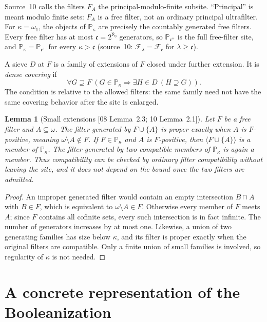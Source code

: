 \documentclass[11pt,letterpaper]{article}
\newtheorem{lemma}[theorem]{Lemma}
\theoremstyle{definition}
\theoremstyle{remark}
\newcommand{\om}{\omega}
\newcommand{\PP}{\mathbb P}
\newcommand{\cc}{\mathfrak c}
\newcommand{\gen}[1]{\langle #1\rangle}
\newcommand{\src}[1]{\textup{[#1]}}
\begin{document}
Source~10 calls the filters $F_A$ the principal-modulo-finite subsite.
``Principal'' is meant modulo finite sets: $F_A$ is a free filter, not
an ordinary principal ultrafilter. For $\kappa=\om_1$, the objects of
$\PP_\kappa$ are precisely the countably generated free filters. Every
free filter has at most $\cc=2^{\aleph_0}$ generators, so $\PP_{\cc^+}$
is the full free-filter site, and $\PP_\kappa=\PP_{\cc^+}$ for every
$\kappa>\cc$ (source~10: $\mathcal F_\lambda=\mathcal F_\cc$ for
$\lambda\geq\cc$).

A sieve $D$ at $F$ is a family of extensions of $F$ closed under further
extension. It is \emph{dense covering} if
\begin{equation}\label{fbc:eq:dense-cover}
 \forall G\supseteq F\ (G\in\PP_\kappa\Rightarrow
 \exists H\in D\ (H\supseteq G)).
\end{equation}
The condition is relative to the allowed filters: the same family need
not have the same covering behavior after the site is enlarged.

\begin{lemma}[Small extensions \src{08 Lemma~2.3; 10 Lemma~2.1}]
\label{fbc:lem:small-extensions}
Let $F$ be a free filter and $A\subseteq\om$. The filter generated by
$F\cup\{A\}$ is proper exactly when $A$ is $F$-positive, meaning
$\om\setminus A\notin F$. If $F\in\PP_\kappa$ and $A$ is $F$-positive,
then $\gen{F\cup\{A\}}$ is a member of $\PP_\kappa$. The filter
generated by two compatible members of $\PP_\kappa$ is again a member.
Thus compatibility can be checked by ordinary filter compatibility
without leaving the site, and it does not depend on the bound once the
two filters are admitted.
\end{lemma}
\begin{proof}
An improper generated filter would contain an empty intersection
$B\cap A$ with $B\in F$, which is equivalent to $\om\setminus A\in F$.
Otherwise every member of $F$ meets $A$; since $F$ contains all cofinite
sets, every such intersection is in fact infinite. The number of
generators increases by at most one. Likewise, a union of two generating
families has size below $\kappa$, and its filter is proper exactly when
the original filters are compatible. Only a finite union of small
families is involved, so regularity of $\kappa$ is not needed.
\end{proof}

\section{A concrete representation of the Booleanization}
\label{fbc:sec:representation}
\end{document}
